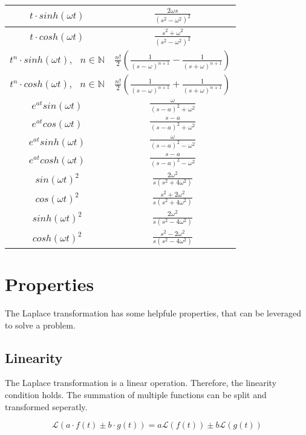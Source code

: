 \documentclass[./\jobname.tex]{subfiles}
\begin{document}
\begin{table}[H]
{\begin{tabular}{|c|c|}
			$t \cdot sinh(\omega t)$ & $\frac{2 \omega s}{(s^2 - \omega^2)^2}$ \\ \hline
			$t \cdot cosh(\omega t)$ & $\frac{s^2 + \omega^2}{(s^2 - \omega^2)^2}$ \\ \hline
			$t^n \cdot sinh(\omega t), \text{ } n \in \mathbb{N}$ & $ \frac{n!}{2} \left( \frac{1}{(s - \omega)^{n + 1}} - \frac{1}{(s + \omega)^{n+1}} \right)$ \\ \hline
			$t^n \cdot cosh(\omega t), \text{ } n \in \mathbb{N}$ & $ \frac{n!}{2} \left( \frac{1}{(s - \omega)^{n + 1}} + \frac{1}{(s + \omega)^{n+1}} \right)$ \\ \hline
			$e^{at} sin(\omega t)$ & $\frac{\omega}{(s - a)^2 + \omega^2}$ \\ \hline
			$e^{at} cos(\omega t)$ & $\frac{s - a}{(s - a)^2 + \omega^2}$ \\ \hline
			$e^{at} sinh(\omega t)$ & $\frac{\omega}{(s - a)^2 - \omega^2}$ \\ \hline
			$e^{at} cosh(\omega t)$ & $\frac{s - a}{(s - a)^2 - \omega^2}$ \\ \hline
			$sin(\omega t)^2$ & $\frac{2 \omega^2}{s(s^2 + 4\omega^2)}$ \\ \hline
			$cos(\omega t)^2$ & $\frac{s^2 + 2\omega^2}{s(s^2 + 4\omega^2)}$ \\ \hline
			$sinh(\omega t)^2$ & $\frac{2 \omega^2}{s(s^2 - 4\omega^2)}$ \\ \hline
			$cosh(\omega t)^2$ & $\frac{s^2 - 2\omega^2}{s(s^2 - 4\omega^2)}$ \\ \hline
		\end{tabular}
	}
\end{table}

\section{Properties}

The Laplace transformation has some helpfule properties, that can be leveraged to solve a problem. 

\subsection{Linearity}

The Laplace transformation is a linear operation. Therefore, the linearity condition holds. The summation of multiple functions can be split and transformed seperatly. 

\begin{equation}
	\mathcal{L} \left(a \cdot f(t) \pm b \cdot g(t)\right) = a \mathcal{L} \left( f(t) \right) \pm b \mathcal{L} \left( g(t) \right)
\end{equation}
\end{document}
